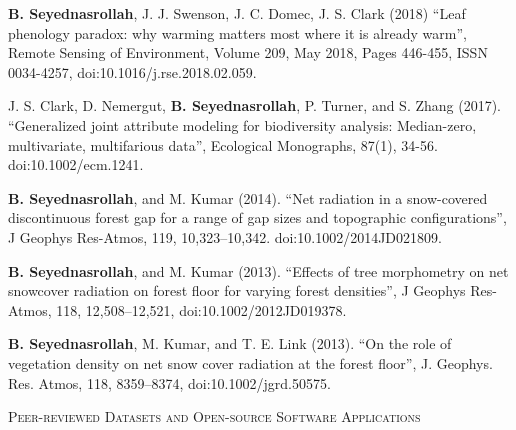 \documentclass[10pt]{article}
\newenvironment{changemargin}[2]{%
  \begin{list}{}{%
 \setlength{\topsep}{0pt}%
 \setlength{\leftmargin}{#1}%
 \setlength{\rightmargin}{#2}%
 \setlength{\listparindent}{\parindent}%
 \setlength{\itemindent}{\parindent}%
 \setlength{\parsep}{\parskip}%
  }%
  \item[]}{\end{list}
}
\newcommand{\lineover}{
  \begin{changemargin}{-0.05in}{-0.05in}
  \vspace*{-8pt}
  \hrulefill \\
  \vspace*{-2pt}
  \end{changemargin}
}
\newcommand{\header}[1]{
  \begin{changemargin}{-0.5in}{-0.5in}
  \scshape{#1}\\
  \lineover
  \end{changemargin}
}
\newenvironment{body} {
  \vspace*{-2pt}
  \begin{changemargin}{-0.5in}{-0.5in}
}
{\end{changemargin}
}
\begin{document}
\begin{body}
\begin{etaremune}
    \item \textbf{B. Seyednasrollah}, J. J. Swenson, J. C. Domec, J. S. Clark (2018) ``Leaf phenology paradox: why warming matters most where it is already warm'', Remote Sensing of Environment, Volume 209, May 2018, Pages 446-455, ISSN 0034-4257, doi:10.1016/j.rse.2018.02.059.\\
    \medskip

    \item J. S. Clark, D. Nemergut, \textbf{B. Seyednasrollah}, P. Turner, and S. Zhang (2017). ``Generalized joint attribute modeling for biodiversity analysis: Median-zero, multivariate, multifarious data'', Ecological Monographs, 87(1), 34-56. doi:10.1002/ecm.1241.\\
    \medskip

    \item \textbf{B. Seyednasrollah}, and M. Kumar (2014). ``Net radiation in a snow-covered discontinuous forest gap for a range of gap sizes and topographic configurations'', J Geophys Res-Atmos, 119, 10,323–10,342. doi:10.1002/2014JD021809. \\
    \medskip

    \item \textbf{B. Seyednasrollah}, and M. Kumar (2013). ``Effects of tree morphometry on net snowcover radiation on forest floor for varying forest densities'', J Geophys Res-Atmos, 118, 12,508–12,521, doi:10.1002/2012JD019378.\\
    \medskip

    \item \textbf{B. Seyednasrollah}, M. Kumar, and T. E. Link (2013). ``On the role of vegetation density on net snow cover radiation at the forest floor'', J. Geophys. Res. Atmos, 118, 8359–8374, doi:10.1002/jgrd.50575.\\
    \medskip

  \end{etaremune}

\end{body}

\medskip



\header{Peer-reviewed Datasets and Open-source Software Applications}
\end{document}
